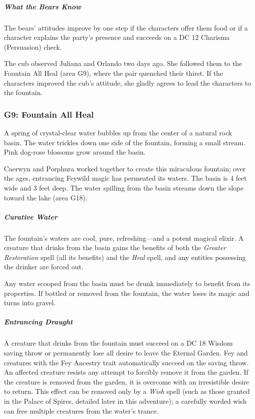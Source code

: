 \documentclass[10pt,a4paper,twoside,bg=print,twocolumn,openany,nodeprecatedcode]{dndbook}
\begin{document}
\subparagraph{What the Bears Know}
The bears' attitudes improve by one step if the characters offer them food or if a character explains the party's presence and succeeds on a DC 12 Charisma (Persuasion) check.

The cub observed Juliana and Orlando two days ago. She followed them to the Fountain All Heal (area G9), where the pair quenched their thirst. If the characters improved the cub's attitude, she gladly agrees to lead the characters to the fountain.

\subsubsection{G9: Fountain All Heal}
\begin{DndReadAloud}{}
A spring of crystal-clear water bubbles up from the center of a natural rock basin. The water trickles down one side of the fountain, forming a small stream. Pink dog-rose blossoms grow around the basin.

\end{DndReadAloud}

Caerwyn and Porphura worked together to create this miraculous fountain; over the ages, entrancing Feywild magic has permeated its waters. The basin is 4 feet wide and 3 feet deep. The water spilling from the basin streams down the slope toward the lake (area G18).

\subparagraph{Curative Water}
The fountain's waters are cool, pure, refreshing—and a potent magical elixir. A creature that drinks from the basin gains the benefits of both the \textit{Greater Restoration} spell (all its benefits) and the \textit{Heal} spell, and any entities possessing the drinker are forced out.

Any water scooped from the basin must be drunk immediately to benefit from its properties. If bottled or removed from the fountain, the water loses its magic and turns into gravel.

\subparagraph{Entrancing Draught}
A creature that drinks from the fountain must succeed on a DC 18 Wisdom saving throw or permanently lose all desire to leave the Eternal Garden. Fey and creatures with the Fey Ancestry trait automatically succeed on the saving throw. An affected creature resists any attempt to forcibly remove it from the garden. If the creature is removed from the garden, it is overcome with an irresistible desire to return. This effect can be removed only by a \textit{Wish} spell (such as those granted in the Palace of Spires, detailed later in this adventure); a carefully worded wish can free multiple creatures from the water's trance.
\end{document}

